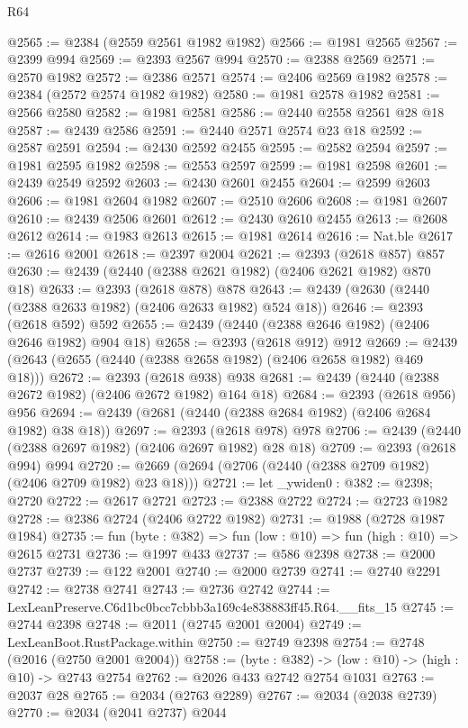 \begin{lexlean}{R64}
\begin{coremodule}
@2565 := @2384 (@2559 @2561 @1982 @1982)
@2566 := @1981 @2565
@2567 := @2399 @994
@2569 := @2393 @2567 @994
@2570 := @2388 @2569
@2571 := @2570 @1982
@2572 := @2386 @2571
@2574 := @2406 @2569 @1982
@2578 := @2384 (@2572 @2574 @1982 @1982)
@2580 := @1981 @2578 @1982
@2581 := @2566 @2580
@2582 := @1981 @2581
@2586 := @2440 @2558 @2561 @28 @18
@2587 := @2439 @2586
@2591 := @2440 @2571 @2574 @23 @18
@2592 := @2587 @2591
@2594 := @2430 @2592 @2455
@2595 := @2582 @2594
@2597 := @1981 @2595 @1982
@2598 := @2553 @2597
@2599 := @1981 @2598
@2601 := @2439 @2549 @2592
@2603 := @2430 @2601 @2455
@2604 := @2599 @2603
@2606 := @1981 @2604 @1982
@2607 := @2510 @2606
@2608 := @1981 @2607
@2610 := @2439 @2506 @2601
@2612 := @2430 @2610 @2455
@2613 := @2608 @2612
@2614 := @1983 @2613
@2615 := @1981 @2614
@2616 := Nat.ble
@2617 := @2616 @2001
@2618 := @2397 @2004
@2621 := @2393 (@2618 @857) @857
@2630 := @2439 (@2440 (@2388 @2621 @1982) (@2406 @2621 @1982) @870 @18)
@2633 := @2393 (@2618 @878) @878
@2643 := @2439 (@2630 (@2440 (@2388 @2633 @1982) (@2406 @2633 @1982) @524 @18))
@2646 := @2393 (@2618 @592) @592
@2655 := @2439 (@2440 (@2388 @2646 @1982) (@2406 @2646 @1982) @904 @18)
@2658 := @2393 (@2618 @912) @912
@2669 := @2439 (@2643 (@2655 (@2440 (@2388 @2658 @1982) (@2406 @2658 @1982) @469 @18)))
@2672 := @2393 (@2618 @938) @938
@2681 := @2439 (@2440 (@2388 @2672 @1982) (@2406 @2672 @1982) @164 @18)
@2684 := @2393 (@2618 @956) @956
@2694 := @2439 (@2681 (@2440 (@2388 @2684 @1982) (@2406 @2684 @1982) @38 @18))
@2697 := @2393 (@2618 @978) @978
@2706 := @2439 (@2440 (@2388 @2697 @1982) (@2406 @2697 @1982) @28 @18)
@2709 := @2393 (@2618 @994) @994
@2720 := @2669 (@2694 (@2706 (@2440 (@2388 @2709 @1982) (@2406 @2709 @1982) @23 @18)))
@2721 := let _ywiden0 : @382 := @2398; @2720
@2722 := @2617 @2721
@2723 := @2388 @2722
@2724 := @2723 @1982
@2728 := @2386 @2724 (@2406 @2722 @1982)
@2731 := @1988 (@2728 @1987 @1984)
@2735 := fun (byte : @382) => fun (low : @10) => fun (high : @10) => @2615 @2731
@2736 := @1997 @433
@2737 := @586 @2398
@2738 := @2000 @2737
@2739 := @122 @2001
@2740 := @2000 @2739
@2741 := @2740 @2291
@2742 := @2738 @2741
@2743 := @2736 @2742
@2744 := LexLeanPreserve.C6d1bc0bcc7cbbb3a169c4e838883ff45.R64.__fits_15
@2745 := @2744 @2398
@2748 := @2011 (@2745 @2001 @2004)
@2749 := LexLeanBoot.RustPackage.within
@2750 := @2749 @2398
@2754 := @2748 (@2016 (@2750 @2001 @2004))
@2758 := (byte : @382) -> (low : @10) -> (high : @10) -> @2743 @2754
@2762 := @2026 @433 @2742 @2754 @1031
@2763 := @2037 @28
@2765 := @2034 (@2763 @2289)
@2767 := @2034 (@2038 @2739)
@2770 := @2034 (@2041 @2737) @2044

\end{coremodule}
\end{lexlean}
